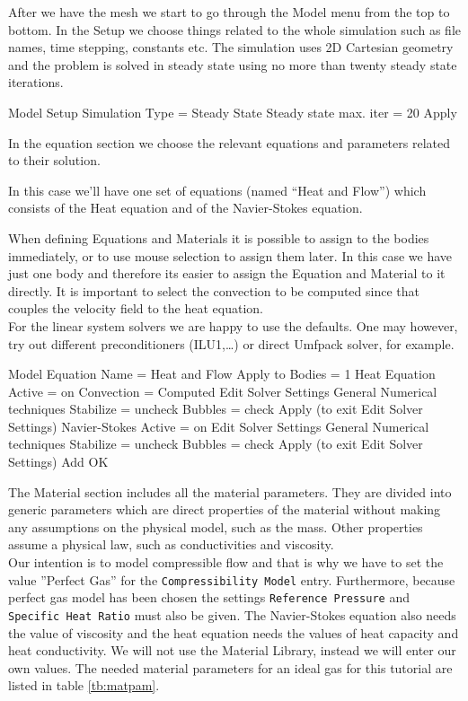 After we have the mesh we start to go through the Model menu from the top to bottom. In the Setup we choose things related to the whole simulation such as file names, 
time stepping, constants etc. The simulation uses 2D Cartesian geometry and the problem is solved in steady state using no more than twenty steady state iterations.

\ttbegin
Model
  Setup 
    Simulation Type = Steady State
    Steady state max. iter = 20
  Apply
\ttend

In the equation section we choose the relevant equations and parameters related to their solution. 

In this case we'll have one set of equations (named ``Heat and Flow'') which consists of the Heat equation and of the Navier-Stokes equation.

When defining Equations and Materials it is possible to assign to the bodies immediately, or to use mouse selection to assign them later. In this case we have just one body and therefore its easier to assign the Equation and Material to it directly.  It is important to select the convection to be computed since that couples the velocity field to the heat equation.\\

For the linear system solvers we are happy to use the defaults. One may however, try out different preconditioners (ILU1,\ldots) or direct Umfpack solver, for example.

\ttbegin
Model
  Equation
   Name = Heat and Flow
    Apply to Bodies = 1
    Heat Equation
      Active = on
      Convection = Computed
        Edit Solver Settings
           General
             Numerical techniques
                Stabilize = uncheck
                Bubbles  = check
          Apply (to exit Edit Solver Settings)
    Navier-Stokes
      Active = on
        Edit Solver Settings
           General
             Numerical techniques
                Stabilize = uncheck
                Bubbles  = check
          Apply (to exit Edit Solver Settings)
    Add 
    OK
\ttend        

The Material section includes all the material parameters. They are divided into generic parameters which are direct properties of the material without making any assumptions on the physical model, such as the mass. Other properties assume a physical law, such as conductivities and viscosity.\\

Our intention is to model compressible flow and that is why we have to set the value ''Perfect Gas'' for the {\tt Compressibility Model} entry. Furthermore, because perfect gas model has been chosen the settings {\tt Reference Pressure} and {\tt Specific Heat Ratio} must also be given. The Navier-Stokes equation also needs the value of viscosity and the heat equation needs the values of heat capacity and heat conductivity.  We will not use the Material Library, instead we will enter our own values.  The needed material parameters for an ideal gas for this tutorial are listed in table \ref{tb:matpam}.


